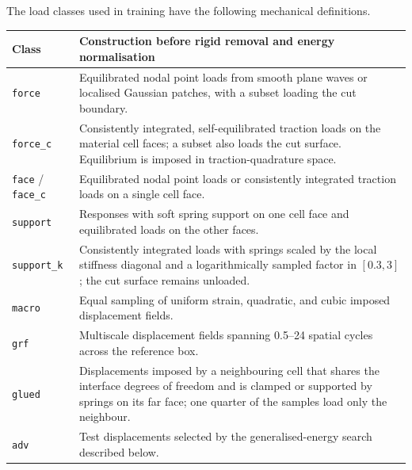 \documentclass[preprint,12pt,authoryear]{elsarticle}
\def\LTcaptype{table}
\begin{document}
The load classes used in training have the following mechanical definitions.

{\def\LTcaptype{} %
{\small
\begin{longtable}[]{@{}
  >{\raggedright\arraybackslash}p{}
  >{\raggedright\arraybackslash}p{}@{}}
\toprule\noalign{}
\begin{minipage}[b]{\linewidth}\raggedright
Class
\end{minipage} & \begin{minipage}[b]{\linewidth}\raggedright
Construction before rigid removal and energy normalisation
\end{minipage} \\
\midrule\noalign{}
\endhead
\bottomrule\noalign{}
\endlastfoot
\texttt{force} & Equilibrated nodal point loads from smooth plane waves or localised Gaussian patches, with a subset loading the cut boundary. \\
\texttt{force\_c} & Consistently integrated, self-equilibrated traction loads on the material cell faces; a subset also loads the cut surface. Equilibrium is imposed in traction-quadrature space. \\
\texttt{face} / \texttt{face\_c} & Equilibrated nodal point loads or consistently integrated traction loads on a single cell face. \\
\texttt{support} & Responses with soft spring support on one cell face and equilibrated loads on the other faces. \\
\texttt{support\_k} & Consistently integrated loads with springs scaled by the local stiffness diagonal and a logarithmically sampled factor in \([0.3,3]\); the cut surface remains unloaded. \\
\texttt{macro} & Equal sampling of uniform strain, quadratic, and cubic imposed displacement fields. \\
\texttt{grf} & Multiscale displacement fields spanning 0.5--24 spatial cycles across the reference box. \\
\texttt{glued} & Displacements imposed by a neighbouring cell that shares the interface degrees of freedom and is clamped or supported by springs on its far face; one quarter of the samples load only the neighbour. \\
\texttt{adv} & Test displacements selected by the generalised-energy search described below. \\
\end{longtable}}
}
\end{document}
